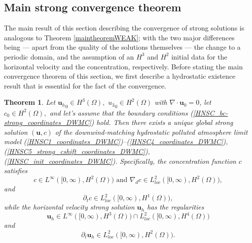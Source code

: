 \documentclass[12pt]{report}
\newtheorem{theorem}{Theorem}
\numberwithin{theorem}{chapter}
\numberwithin{corollary}{chapter}
\numberwithin{lemma}{chapter}
\numberwithin{remark}{chapter}
\numberwithin{definition}{chapter}
\numberwithin{prop}{chapter}
\begin{document}
\subsection{Main strong convergence theorem}\label{sectionSTRONGsol_convergence}

The main result of this section describing the convergence of strong solutions is analogous to Theorem \ref{maintheoremWEAK}; with the two major differences being --- apart from the quality of the solutions themselves --- the change to a periodic domain, and the assumption of an $H^3$ and $H^2$ initial data for the horizontal velocity and the concentration, respectively. Before stating the main convergence theorem of this section, we first describe a hydrostatic existence result that is essential for the fact of the convergence.

\begin{theorem} \label{existenceconcentrationSTRONG}
Let ${\mathbf{u}_h}_0 \in H^3(\Omega),$ ${u_3}_0 \in H^2(\Omega)$ with $\nabla \cdot \mathbf{u}_0 = 0$, let $c_0 \in H^2 (\Omega),$ and let's assume that the boundary conditions (\ref{HNSC_bc-strong_coordinates_DWMC}) hold. Then there exists a unique global strong solution $(\mathbf{u}, c)$ of the downwind-matching hydrostatic polluted atmosphere limit model (\ref{HNSC1_coordinates_DWMC})--(\ref{HNSC4_coordinates_DWMC}), (\ref{HNSC5_strong_cshift_coordinates_DWMC}), (\ref{HNSC_init_coordinates_DWMC}). Specifically, the concentration function $c$ satisfies
%
    \begin{equation} \label{regularity_c_first}
      c \in L^\infty([0, \infty), H^2(\Omega)) \text{ and } \nabla_d c \in L^2_{loc}([0, \infty), H^2(\Omega)),
    \end{equation}
%
and
%
    \begin{equation}
      \partial_t c \in L^2_{loc}([0, \infty), H^1(\Omega)),
    \end{equation}
%
while the horizontal velocity strong solution $\mathbf{u}_h$ has the regularities
%
    \begin{equation} \label{u_regularities_first}
      \mathbf{u}_h \in L^\infty([0, \infty), H^3(\Omega)) \cap L^2_{loc}([0, \infty), H^4(\Omega))
    \end{equation}
%
and
%
    \begin{equation} \label{u_regularities_second}
      \partial_t \mathbf{u}_h \in L^2_{loc}([0, \infty), H^2(\Omega)).
    \end{equation}
%
\end{theorem}
\end{document}
